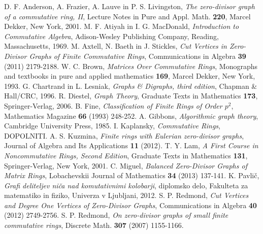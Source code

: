 \documentclass[a4paper, 12pt]{amsart}
\theoremstyle{definition} %
\theoremstyle{plain} %
\begin{document}
\begin{thebibliography}{99}
 D. F. Anderson, A. Frazier, A. Lauve in P. S. Livingston, \emph{The zero-divisor graph of a commutative ring, II}, Lecture Notes in Pure and Appl. Math. {\bf 220}, Marcel Dekker, New York, 2001.
M. F. Atiyah in I. G. MacDonald, \emph{Introduction to Commutative Algebra}, Adison-Wesley Publishing Company, Reading, Massachusetts, 1969.
 M. Axtell, N. Baeth in J. Stickles, \emph{Cut Vertices in Zero-Divisor Graphs of Finite Commutative Rings}, Communications in Algebra {\bf 39} (2011) 2179-2188.
 W. C. Brown, \emph{Matrices Over Commutative Rings}, Monographs and textbooks in pure and applied mathematics {\bf 169}, Marcel Dekker, New York, 1993.
G. Chartrand in L. Lesniak, \emph{Graphs \& Digraphs, third edition}, Chapman \& Hall/CRC,  1996.
R. Diestel, \emph{Graph Theory}, Graduate Texts in Mathematics {\bf 173}, Springer-Verlag, 2006.
B. Fine, \emph{Classification of Finite Rings of Order $p^2$}, Mathematics Magazine {\bf 66} (1993) 248-252. 
A. Gibbons, \emph{Algorithmic graph theory}, Cambridge University Press, 1985.
I. Kaplansky, \emph{Commutative Rings}, DOPOLNITI.
A. S. Kuzmina, \emph{Finite rings with Eulerian zero-divisor graphs}, Journal of Algebra and Its Applications {\bf 11} (2012).
 T. Y. Lam, \emph{A First Course in Noncommutative Rings, Second Edition}, Graduate Texts in Mathematics {\bf 131}, Springer-Verlag, New York, 2001.
C. Miguel, \emph{Balanced Zero-Divisor Graphs of Matrix Rings}, Lobachevskii Journal of Mathematics {\bf 34} (2013) 137-141.
K. Pavlič, \emph{Grafi deliteljev niča nad komutativnimi kolobarji}, diplomsko delo, Fakulteta za matematiko in fiziko, Univerza v Ljubljani, 2012.
 S. P. Redmond, \emph{Cut Vertices and Degree One Vertices of Zero-Divisor Graphs}, Communications in Algebra {\bf 40} (2012) 2749-2756.
 S. P. Redmond, \emph{On zero-divisor graphs of small finite commutative rings}, Discrete Math. {\bf 307} (2007) 1155-1166.
\end{thebibliography}
\end{document}
